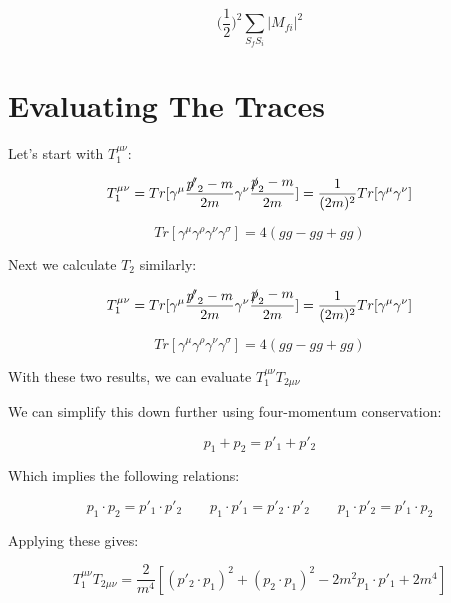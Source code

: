 \documentclass[a4]{article}
\begin{document}
    \begin{equation}
        \bigg( \frac{1}{2} \bigg)^2 \sum_{S_f S_i} |M_{f i}|^2
    \end{equation}

    \section*{Evaluating The Traces}

    Let's start with $T_1^{\mu \nu}$:

    \begin{equation}
        T_1^{\mu \nu} = Tr [\gamma^\mu \frac{\slashed{p'}_2 - m}{2m} \gamma^\nu \frac{\slashed{p}_2 - m}{2 m}] = \frac{1}{(2m)^2} Tr[\gamma^\mu \gamma^\nu]
    \end{equation}

    \begin{equation}
        Tr [\gamma^\mu \gamma^\rho \gamma^\nu \gamma^\sigma] = 4(g g - g g + g g)
    \end{equation}

    Next we calculate $T_2$ similarly:

    \begin{equation}
        T_1^{\mu \nu} = Tr [\gamma^\mu \frac{\slashed{p'}_2 - m}{2m} \gamma^\nu \frac{\slashed{p}_2 - m}{2 m}] = \frac{1}{(2m)^2} Tr[\gamma^\mu \gamma^\nu]
    \end{equation}

    \begin{equation}
        Tr [\gamma^\mu \gamma^\rho \gamma^\nu \gamma^\sigma] = 4(g g - g g + g g)
    \end{equation}

    With these two results, we can evaluate $T_1^{\mu \nu} T_{2 \mu \nu}$

    We can simplify this down further using four-momentum conservation:

    \begin{equation}
        p_1 + p_2 = p'_1 + p'_2
    \end{equation}

    Which implies the following relations:

    \begin{equation}
        p_1 \cdot p_2 = p'_1 \cdot p'_2 \qquad p_1 \cdot p'_1 = p'_2 \cdot p'_2 \qquad p_1 \cdot p'_2 = p'_1 \cdot p_2
    \end{equation}

    Applying these gives:

    \begin{equation}
        T_1^{\mu \nu} T_{2 \mu \nu} = \frac{2}{m^4} [(p'_2 \cdot p_1)^2 + (p_2 \cdot p_1)^2 - 2 m^2 p_1 \cdot p'_1 + 2m^4]
    \end{equation}
\end{document}
